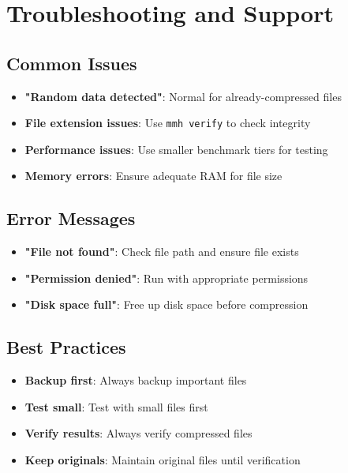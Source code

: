 \documentclass[12pt,a4paper]{article}
\begin{document}
\newpage

\section{Troubleshooting and Support}

\subsection{Common Issues}
\begin{itemize}
    \item \textbf{"Random data detected"}: Normal for already-compressed files
    \item \textbf{File extension issues}: Use \texttt{mmh verify} to check integrity
    \item \textbf{Performance issues}: Use smaller benchmark tiers for testing
    \item \textbf{Memory errors}: Ensure adequate RAM for file size
\end{itemize}

\subsection{Error Messages}
\begin{itemize}
    \item \textbf{"File not found"}: Check file path and ensure file exists
    \item \textbf{"Permission denied"}: Run with appropriate permissions
    \item \textbf{"Disk space full"}: Free up disk space before compression
\end{itemize}

\subsection{Best Practices}
\begin{itemize}
    \item \textbf{Backup first}: Always backup important files
    \item \textbf{Test small}: Test with small files first
    \item \textbf{Verify results}: Always verify compressed files
    \item \textbf{Keep originals}: Maintain original files until verification
\end{itemize}

\newpage
\end{document}

